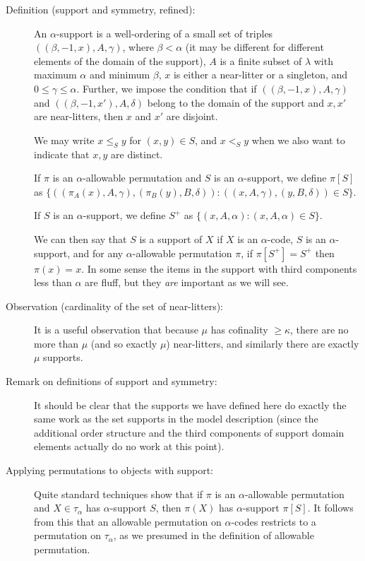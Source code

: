 \documentclass[112pt]{article}
\begin{document}
\begin{description}

\item[Definition (support and symmetry, refined):]  An $\alpha$-support is a well-ordering of a small set of triples $((\beta,-1,x),A,\gamma)$, where $\beta<\alpha$ (it may be different for different elements of the domain of the support), $A$ is a finite subset of $\lambda$ with maximum $\alpha$ and minimum $\beta$, $x$ is either a near-litter or a singleton, and $0 \leq \gamma \leq\alpha$.  Further, we impose the condition that if $((\beta,-1,x),A,\gamma)$ and $((\beta,-1,x'),A,\delta)$ belong to the domain of the support and $x,x'$ are near-litters, then $x$ and $x'$ are disjoint.

We may write $x \leq_S y$ for $(x,y) \in S$, and $x <_S y$ when we also want to indicate that $x,y$ are distinct.

If $\pi$ is an $\alpha$-allowable permutation and $S$ is an $\alpha$-support, we define $\pi[S]$ as $\{((\pi_A(x),A,\gamma),(\pi_B(y),B,\delta)):((x,A,\gamma),(y,B,\delta))\in S\}$.

If $S$ is an $\alpha$-support, we define $S^+$ as $\{(x,A,\alpha):(x,A,\alpha) \in S\}$.

We can then say that $S$ is a support of $X$ if $X$ is an $\alpha$-code, $S$ is an $\alpha$-support, and for any $\alpha$-allowable permutation $\pi$, if $\pi[S^+]=S^+$ then $\pi(x)=x$.  In some sense the items in the support with third components less than $\alpha$ are fluff, but they {\em are\/} important as we will see.

\item[Observation (cardinality of the set of near-litters):]  It is a useful observation that because $\mu$ has cofinality $\geq \kappa$, there are no more than $\mu$ (and so exactly $\mu$) near-litters,
and similarly there are exactly $\mu$ supports.

\item[Remark on definitions of support and symmetry:]  It should be clear that the supports we have defined here do exactly the same work as the set supports in the model description (since the additional order structure and the third components of support domain elements actually do no work at this point).

\item[Applying permutations to objects with support:]  Quite standard techniques show that if $\pi$ is an $\alpha$-allowable permutation and $X \in \tau_\alpha$ has $\alpha$-support $S$, then $\pi(X)$ has $\alpha$-support $\pi[S]$.   It follows from this that an allowable permutation on $\alpha$-codes restricts to a permutation on $\tau_\alpha$, as we presumed in the definition of allowable permutation.


\end{description}
\end{document}
